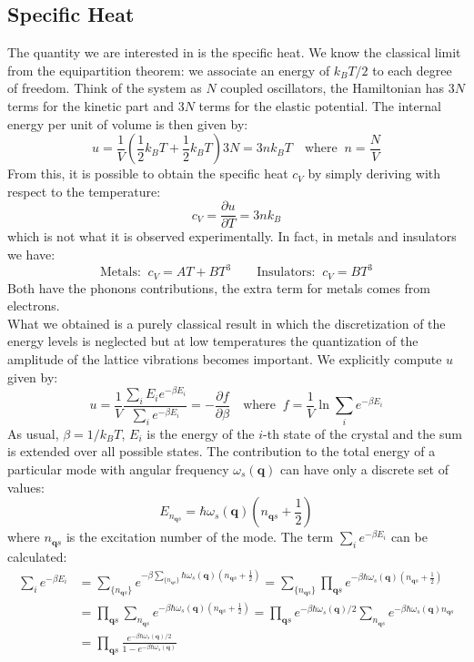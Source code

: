 \documentclass[10.75pt,a4paper,openright,bottom=2cm]{article}
\renewcommand{\Vec}[1]{\boldsymbol{#1}}
\begin{document}
\subsection{Specific Heat}
The quantity we are interested in is the specific heat. We know the classical limit from the equipartition theorem: we associate an energy of $k_BT/2$ to each degree of freedom. Think of the system as $N$ coupled oscillators, the Hamiltonian has $3N$ terms for the kinetic part and $3N$ terms for the elastic potential. The internal energy per unit of volume is then given by:
\[
u=\frac{1}{V}\left(\frac{1}{2}k_BT+\frac{1}{2}k_BT\right)3N=3nk_BT \quad \text{where}\;\;n=\frac{N}{V}
\]
From this, it is possible to obtain the specific heat $c_V$ by simply deriving with respect to the temperature:
\[
c_V=\frac{\partial u}{\partial T}=3nk_B
\]
which is not what it is observed experimentally. In fact, in metals and insulators we have:
\[
\text{Metals:}\;\;c_V=AT+BT^3 \qquad \text{Insulators:}\;\;c_V=BT^3
\]
Both have the phonons contributions, the extra term for metals comes from electrons.\\
What we obtained is a purely classical result in which the discretization of the energy levels is neglected but at low temperatures the quantization of the amplitude of the lattice vibrations becomes important. We explicitly compute $u$ given by:
\[
u=\frac{1}{V}\frac{\sum_iE_ie^{-\beta E_i}}{\sum_ie^{-\beta E_i}}=-\frac{\partial f}{\partial\beta} \quad \text{where}\;\;f=\frac{1}{V}\ln{\sum_ie^{-\beta E_i}}
\]
As usual, $\beta=1/k_BT$, $E_i$ is the energy of the $i$-th state of the crystal and the sum is extended over all possible states. The contribution to the total energy of a particular mode with angular frequency $\omega_s(\Vec{q})$ can have only a discrete set of values:
\[
E_{n_{\Vec{q}s}}=\hbar\omega_s(\Vec{q})\left(n_{\Vec{q}s}+\frac{1}{2}\right)
\]
where $n_{\Vec{q}s}$ is the excitation number of the mode. The term $\sum_ie^{-\beta E_i}$ can be calculated:
\begin{align*}
\sum_ie^{-\beta E_i}&=\sum_{\{n_{\Vec{q}s}\}}e^{-\beta\sum_{\{n_{\Vec{q}s}\}}\hbar\omega_s(\Vec{q})\left(n_{\Vec{q}s}+\frac{1}{2}\right)}=\sum_{\{n_{\Vec{q}s}\}}\prod_{\Vec{q}s}e^{-\beta\hbar\omega_s(\Vec{q})\left(n_{\Vec{q}s}+\frac{1}{2}\right)}\\
&=\prod_{\Vec{q}s}\sum_{n_{\Vec{q}s}}e^{-\beta\hbar\omega_s(\Vec{q})\left(n_{\Vec{q}s}+\frac{1}{2}\right)}=\prod_{\Vec{q}s}e^{-\beta\hbar\omega_s(\Vec{q})/2}\sum_{n_{\Vec{q}s}}e^{-\beta\hbar\omega_s(\Vec{q})n_{\Vec{q}s}}\\
&=\prod_{\Vec{q}s}\frac{e^{-\beta\hbar\omega_s(\Vec{q})/2}}{1-e^{-\beta\hbar\omega_s(\Vec{q})}}
\end{align*}
\end{document}
